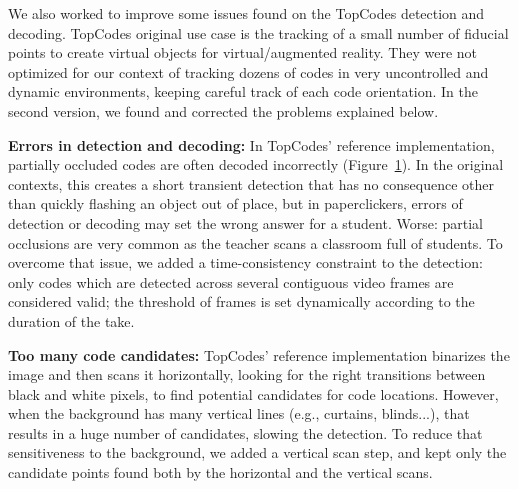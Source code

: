 \begin{figure}[ht]
    \centering
    \begin{minipage}{\linewidth}
        \centering
        \setlength{\fboxsep}{0pt}
        \label{fig:decodingError}
    \end{minipage}
\end{figure}

We also worked to improve some issues found on the TopCodes detection and decoding. TopCodes original use case is the tracking of a small number of fiducial points to create virtual objects for virtual/augmented reality. They were not optimized for our context of tracking dozens of codes in very uncontrolled and dynamic environments, keeping careful track of each code orientation. In the second version, we found and corrected the problems explained below.

\textbf{Errors in detection and decoding:} In TopCodes' reference implementation, partially occluded codes are often decoded incorrectly (Figure~\ref{fig:decodingError}). In the original contexts, this creates a short transient detection that has no consequence other than quickly flashing an object out of place, but in paperclickers, errors of detection or decoding may set the wrong answer for a student. Worse: partial occlusions are very common as the teacher scans a classroom full of students. To overcome that issue, we added a time-consistency constraint to the detection: only codes which are detected across several contiguous video frames are considered valid; the threshold of frames is set dynamically according to the duration of the take.

\textbf{Too many code candidates:} TopCodes' reference implementation binarizes the image and then scans it horizontally, looking for the right transitions between black and white pixels, to find potential candidates for code locations. However, when the background has many vertical lines (e.g., curtains, blinds...), that results in a huge number of candidates, slowing the detection.  To reduce that sensitiveness to the background, we added a vertical scan step, and kept only the candidate points found both by the horizontal and the vertical scans.


